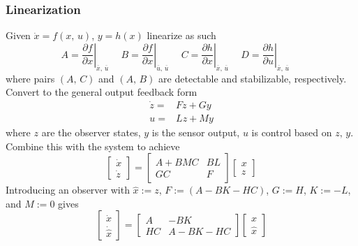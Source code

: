 \documentclass[twocolumn]{article}    %
\begin{document}
\subsubsection*{Linearization}
Given \(\dot{x} = f(x,\,u)\), \(y=h(x)\) linearize as such
\begin{equation*}
    A = \left.\frac{\partial f}{\partial x}\right|_{\overline{x},\,\overline{u}} \hspace{15pt}  B = \left.\frac{\partial f}{\partial x}\right|_{\overline{u},\,\overline{u}} \hspace{15pt}  C = \left.\frac{\partial h}{\partial x}\right|_{\overline{x},\,\overline{u}} \hspace{15pt}  D = \left.\frac{\partial h}{\partial u}\right|_{\overline{x},\,\overline{u}} \hspace{15pt}
\end{equation*}
where pairs \((A,\,C)\) and \((A,\,B)\) are detectable and stabilizable, respectively. Convert to the general output feedback form
\begin{align*}
    \dot{z} =& Fz + Gy\\
    u =& Lz + My
\end{align*}
where \(z\) are the observer states, \(y\) is the sensor output, \(u\) is control based on \(z,\,y\). Combine this with the system to achieve
\begin{equation*}
    \begin{bmatrix}
        \dot{x} \\ \dot{z} 
    \end{bmatrix} = \begin{bmatrix}
        A+BMC & BL \\ GC & F
    \end{bmatrix} \begin{bmatrix}
        x \\ z
    \end{bmatrix}
\end{equation*}
Introducing an observer with \(\hat{x}:= z\), \(F:= (A-BK-HC)\), \(G:=H\), \(K:=-L\), and \(M:=0\) gives
\begin{equation*}
    \begin{bmatrix}
        \dot{x} \\ \dot{\hat{x}}
    \end{bmatrix} = \begin{bmatrix}
        A & -BK\\ HC & A-BK-HC
    \end{bmatrix}\begin{bmatrix}
        x\\ \hat{x}
    \end{bmatrix}
\end{equation*}
\end{document}
